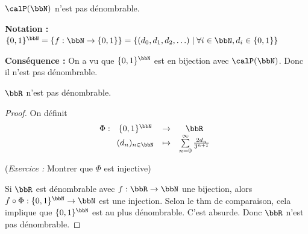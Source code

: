 \begin{cor}
    $\calP(\bbN)$ n'est pas dénombrable.
\end{cor}

\textbf{Notation :} $\{ 0, 1 \}^\bbN = \{ f: \bbN \to \{ 0, 1 \} \} =
\{ (d_0, d_1, d_2, \ldots) \mid \forall i \in \bbN, d_i \in \{ 0, 1 \} \} $

\textbf{Conséquence :} On a vu que $\{ 0, 1 \}^\bbN$ est en bijection avec $\calP(\bbN)$. Donc il n'est pas dénombrable.

\begin{thm}
    $\bbR$ n'est pas dénombrable.
\end{thm}

\begin{proof}
    On définit \[ \Phi: \begin{array}[t]{ccc}
        \{ 0, 1 \}^\bbN & \to & \bbR \\
        (d_n)_{n \in \bbN} & \tp & \sum\limits_{n = 0}^\infty \frac{2d_n}{3^{n + 1}}
    \end{array} \]
    
    (\textit{Exercice :} Montrer que $\Phi$ est injective)
    
    Si $\bbR$ est dénombrable avec $f: \bbR \to \bbN$ une bijection,
    alors $f \circ \Phi: \{ 0, 1 \}^\bbN \to \bbN$ est une injection.
    Selon le thm de comparaison, cela implique que $\{ 0, 1 \}^\bbN$ est au plus dénombrable.
    C'est absurde. Donc $\bbR$ n'est pas dénombrable. \qedhere
\end{proof}